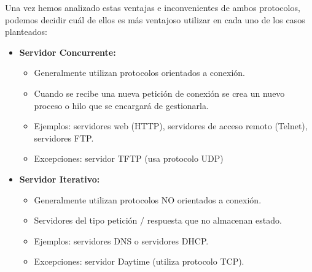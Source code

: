 \begin{problem}[17]
Una vez hemos analizado estas ventajas e inconvenientes de ambos protocolos, podemos decidir cuál de ellos es más ventajoso utilizar en cada uno de los casos planteados:

\begin{itemize}
\item \textbf{Servidor Concurrente:}
\begin{itemize}
\item Generalmente utilizan protocolos orientados a conexión.
\item Cuando se recibe una nueva petición de conexión se crea un
nuevo proceso o hilo que se encargará de gestionarla.
\item Ejemplos: servidores web (HTTP), servidores de acceso
remoto (Telnet), servidores FTP.
\item Excepciones: servidor TFTP (usa protocolo UDP)
\end{itemize}
\item \textbf{Servidor Iterativo:}
\begin{itemize}
\item Generalmente utilizan protocolos NO orientados a conexión.
\item Servidores del tipo petición / respuesta que no almacenan
estado.
\item Ejemplos: servidores DNS o servidores DHCP.
\item Excepciones: servidor Daytime (utiliza protocolo TCP).
\end{itemize}
\end{itemize}
  \end{problem}

